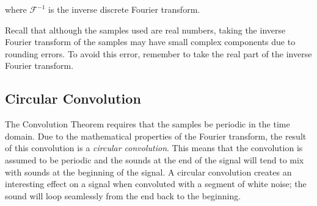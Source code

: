 where  $\mathcal{F}^{-1}$ is the inverse discrete Fourier transform. 

Recall that although the samples used are real numbers, taking the inverse Fourier transform of the samples may have small complex components due to rounding errors. 
To avoid this error, remember to take the real part of the inverse Fourier transform.

\subsection*{Circular Convolution}
The Convolution Theorem requires that the samples be periodic in the time domain. 
Due to the mathematical properties of the Fourier transform, the result of this convolution is a \emph{circular convolution}. 
This means that the convolution is assumed to be periodic and the sounds at the end of the signal will tend to mix with sounds at the beginning of the signal. 
A circular convolution creates an interesting effect on a signal when convoluted with a segment of white noise; the sound will loop seamlessly from the end back to the beginning.

